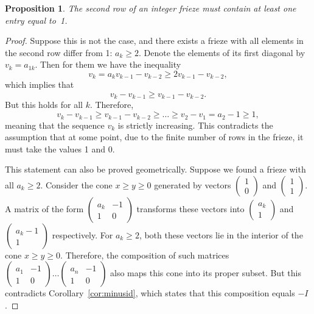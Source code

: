 \documentclass[a4paper,11pt]{amsart}
\theoremstyle{plain}
\newtheorem{prop}[theorem]{Proposition}
\theoremstyle{remark}
\theoremstyle{definition}
\numberwithin{equation}{section}
\numberwithin{figure}{section}
\begin{document}
\begin{prop} The second row of an integer frieze must contain at least one entry equal to~1.
\end{prop}

\begin{proof}
Suppose this is not the case, and there exists a frieze with all elements in the second row differ from 1: $a_k \geq 2$. Denote the elements of its first diagonal by $v_k = a_{1k}$. Then for them we have the inequality
\[
v_k = a_k v_{k-1} - v_{k-2} \geq 2v_{k-1} - v_{k-2},
\]
which implies that
\[
v_k - v_{k-1} \geq v_{k-1} - v_{k-2}.
\]
But this holds for all $k$. Therefore,
\[
v_k - v_{k-1} \geq v_{k-1} - v_{k-2} \geq \dots \geq v_2 - v_1 = a_2 - 1 \geq 1,
\]
meaning that the sequence $v_k$ is strictly increasing. This contradicts the assumption that at some point, due to the finite number of rows in the frieze, it must take the values 1 and 0.

This statement can also be proved geometrically. Suppose we found a frieze with all $a_k \geq 2$. Consider the cone $x \geq y \geq 0$ generated by vectors $\begin{pmatrix}1\\0\end{pmatrix}$ and $\begin{pmatrix}1\\1\end{pmatrix}$. A matrix of the form 
$\begin{pmatrix}a_k & -1\\1 & 0\end{pmatrix}$ transforms these vectors into $\begin{pmatrix}a_k\\1\end{pmatrix}$ and $\begin{pmatrix}a_k-1\\1\end{pmatrix}$ respectively. For $a_k \geq 2$, both these vectors lie in the interior of the cone $x \geq y \geq 0$. Therefore, the composition of such matrices $\begin{pmatrix}a_1 & -1\\1 & 0\end{pmatrix}\dots\begin{pmatrix}a_n & -1\\1 & 0\end{pmatrix}$ also maps this cone into its proper subset. But this contradicts Corollary~\ref{cor:minusid}, which states that this composition equals $-I$.
\end{proof}
\end{document}
